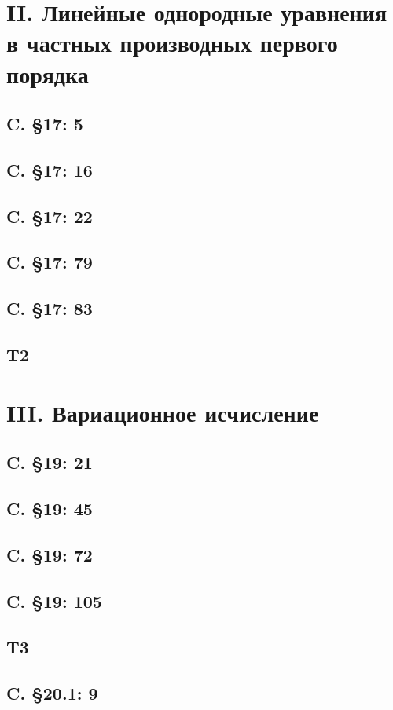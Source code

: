 \documentclass{article}
\begin{document}
\section{II. Линейные однородные уравнения в частных производных первого порядка}
\subsection{C. \S17: 5}
\subsection{C. \S17: 16}
\subsection{C. \S17: 22}
\subsection{C. \S17: 79}
\subsection{C. \S17: 83}
\subsection{T2}

\section{III. Вариационное исчисление}
\subsection{C. \S19: 21}
\subsection{C. \S19: 45}
\subsection{C. \S19: 72}
\subsection{C. \S19: 105}
\subsection{T3}
\subsection{C. \S20.1: 9}
\end{document}
